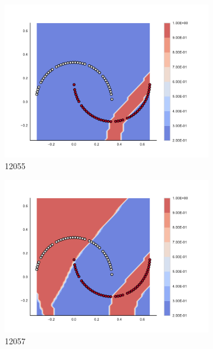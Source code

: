 \begin{figure}[h]
\begin{subfigure}[b]{0.09\textwidth}
    \includegraphics[clip, trim=2.35cm 1.75cm 4.5cm 0cm,width=\textwidth]{img/convergence/12055.pdf}
    \caption{12055}
    \label{fig:convergence_12055}
\end{subfigure}
%
\begin{subfigure}[b]{0.09\textwidth}
    \includegraphics[clip, trim=2.35cm 1.75cm 4.5cm 0cm,width=\textwidth]{img/convergence/12057.pdf}
    \caption{12057}
    \label{fig:convergence_12057}
\end{subfigure}
%
\begin{subfigure}[b]{0.09\textwidth}

\end{subfigure}
\end{figure}
